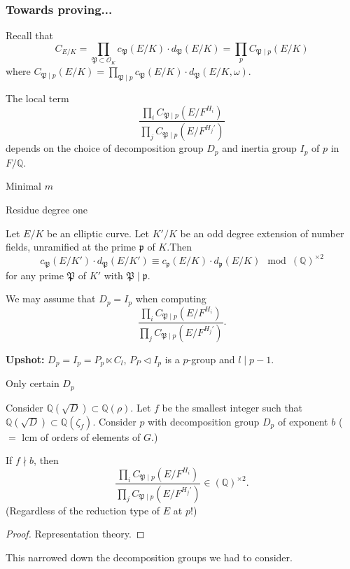 \documentclass{beamer}
\newcommand{\bQ}{\mathbb{Q}}
\newcommand{\fP}{\mathfrak{P}}
\newcommand{\fp}{\mathfrak{p}}
\newcommand{\cO}{\mathcal{O}}
\theoremstyle{plain}
\begin{document}
\begin{frame}
    \frametitle{Towards proving...}
    Recall that 
    $$ C_{E / K} = \prod_{\fP \subset \cO_K} 
    c_{\fP}(E / K) \cdot d_{\fP}(E / K) = \prod_p C_{\fP \mid p}(E / K)
    $$
    where $C_{\fP \mid p}(E / K) = \prod_{\fP \mid p} c_{\fP}(E / K) \cdot d_{\fP}(E / K, \omega)$.\pause 

    The local term $$\frac{\prod_i C_{\fP \mid p}(E / F^{H_i})}{\prod_j C_{\fP \mid p}(E / F^{H_j'})}$$ 
    depends on the choice of decomposition group $D_{p}$ and inertia group $I_{p}$ of $p$ in $F / \bQ$.
\end{frame}

\begin{frame}{Minimal $m$}
    
\end{frame}

\begin{frame}{Residue degree one}
    
    \begin{lemma}
       Let $E / K$ be an elliptic curve. Let $K' / K$ be an odd degree extension of number fields, unramified at the prime $\fp$ of $K$.\pause Then 
       \[  c_{\fP}(E / K')\cdot d_{\fP}(E / K') \equiv c_{\fp}(E / K)\cdot d_{\fp}(E / K) \mod (\bQ)^{\times 2} \]
       for any prime $\fP$ of $K'$ with $\fP \mid \fp$.
    \end{lemma}\pause

    \begin{corollary}
        We may assume that $D_p = I_p$ when computing 
        $$\frac{\prod_i C_{\fP \mid p}(E / F^{H_i})}{\prod_j C_{\fP \mid p}(E / F^{H_j'})}.$$ 
    \end{corollary}\pause

    \textbf{Upshot:} $D_p = I_p = P_p \ltimes C_l$, $P_P \triangleleft I_p$ is a $p$-group and $l \mid p - 1$.  
\end{frame}

\begin{frame}{Only certain $D_p$}
    \begin{lemma}
        Consider $\bQ(\sqrt{D}) \subset \bQ(\rho)$. Let $f$ be the smallest integer such that $\bQ(\sqrt{D}) \subset \bQ(\zeta_{f})$. \pause 
        Consider $p$ with decomposition group $D_p$ of exponent $b$ ( $=$ lcm of orders of elements of $G$.) \pause 

        If $f \nmid b$, then 
        $$\frac{\prod_i C_{\fP \mid p}(E / F^{H_i})}{\prod_j C_{\fP \mid p}(E / F^{H_j'})} \in (\bQ)^{\times 2}.$$\pause (Regardless of the reduction type of $E$ at $p$!)
    \end{lemma}\pause

    \begin{proof}
        Representation theory. \pause
    \end{proof}
    
    This narrowed down the decomposition groups we had to consider. 
\end{frame}
\end{document}
